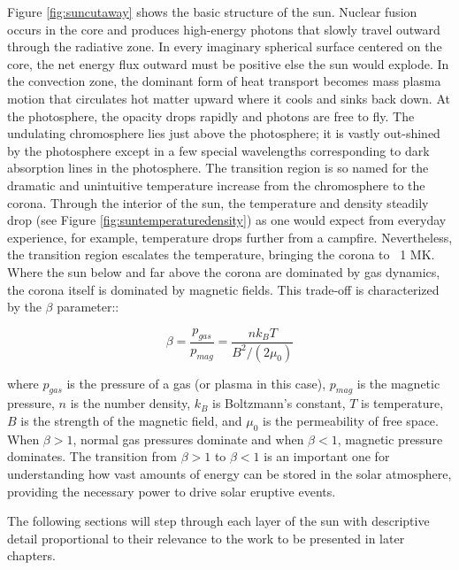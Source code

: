 Figure \ref{fig:suncutaway} shows the basic structure of the sun. Nuclear fusion occurs in the core and produces high-energy photons that slowly travel outward through the radiative zone. In every imaginary spherical surface centered on the core, the net energy flux outward must be positive else the sun would explode. In the convection zone, the dominant form of heat transport becomes mass plasma motion that circulates hot matter upward where it cools and sinks back down. At the photosphere, the opacity drops rapidly and photons are free to fly. The undulating chromosphere lies just above the photosphere; it is vastly out-shined by the photosphere except in a few special wavelengths corresponding to dark absorption lines in the photosphere. The transition region is so named for the dramatic and unintuitive temperature increase from the chromosphere to the corona. Through the interior of the sun, the temperature and density steadily drop (see Figure \ref{fig:suntemperaturedensity}) as one would expect from everyday experience, for example, temperature drops further from a campfire. Nevertheless, the transition region escalates the temperature, bringing the corona to ~1 MK. Where the sun below and far above the corona are dominated by gas dynamics, the corona itself is dominated by magnetic fields. This trade-off is characterized by the $\beta$ parameter:: 

\begin{equation}
    \beta = \frac{p_{gas}}{p_{mag}} = \frac{nk_BT}{B^2/(2\mu_0)}
\end{equation}

\noindent where $p_{gas}$ is the pressure of a gas (or plasma in this case), $p_{mag}$ is the magnetic pressure, $n$ is the number density, $k_B$ is Boltzmann's constant, $T$ is temperature, $B$ is the strength of the magnetic field, and $\mu_0$ is the permeability of free space. When $\beta > 1$, normal gas pressures dominate and when $\beta < 1$, magnetic pressure dominates. The transition from $\beta > 1$ to $\beta < 1$ is an important one for understanding how vast amounts of energy can be stored in the solar atmosphere, providing the necessary power to drive solar eruptive events. 

The following sections will step through each layer of the sun with descriptive detail proportional to their relevance to the work to be presented in later chapters. 

